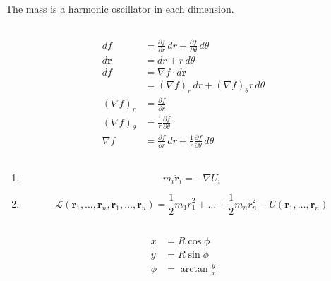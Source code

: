 \documentclass{article}
\renewcommand{\vec}[1]{\boldsymbol{\mathbf{#1}}}
\newcommand{\dvec}[1]{\dot{\vec{#1}}}
\newcommand{\ddvec}[1]{\ddot{\vec{#1}}}
\begin{document}
The mass is a harmonic oscillator in each dimension.

\setcounter{subsection}{4}
\subsection{}

\begin{align*}
  d f               & = \frac{\partial f}{\partial r} \,d r + \frac{\partial f}{\partial \theta} \,d \theta             \\
  d \vec{r}         & = d r + r \,d \theta                                                                              \\
  d f               & = \nabla f \cdot d \vec{r}                                                                        \\
                    & = (\nabla f)_r \,d r + (\nabla f)_\theta r \,d \theta                                             \\
  (\nabla f)_r      & = \frac{\partial f}{\partial r}                                                                   \\
  (\nabla f)_\theta & = \frac{1}{r} \frac{\partial f}{\partial \theta}                                                  \\
  \nabla f          & = \frac{\partial f}{\partial r} \,d r + \frac{1}{r} \frac{\partial f}{\partial \theta} \,d \theta
\end{align*}

\setcounter{subsection}{6}
\subsection{}

\begin{enumerate}
  \item \[m_i \ddvec{r}_i = -\nabla U_i\]

  \item \[\mathcal{L}({\vec{r}_1, \ldots, \vec{r}_n, \dvec{r}_1, \ldots, \dvec{r}_n}) = \frac{1}{2} m_1 \dot{r}_1^2 + \ldots + \frac{1}{2} m_n \dot{r}_n^2 - U(\vec{r}_1, \ldots, \vec{r}_n)\]
\end{enumerate}

\setcounter{subsection}{8}
\subsection{}

\begin{align*}
  x    & = R \cos \phi         \\
  y    & = R \sin \phi         \\
  \phi & = \arctan \frac{y}{x}
\end{align*}
\end{document}
